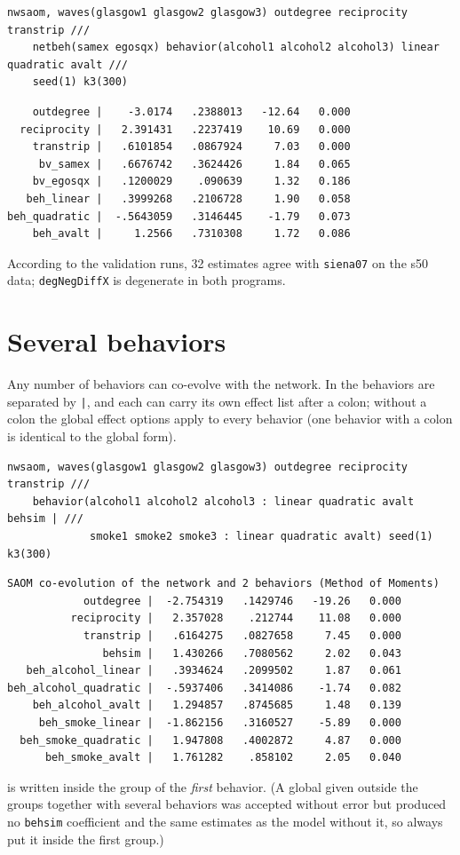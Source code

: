 \begin{lstlisting}
nwsaom, waves(glasgow1 glasgow2 glasgow3) outdegree reciprocity transtrip ///
    netbeh(samex egosqx) behavior(alcohol1 alcohol2 alcohol3) linear quadratic avalt ///
    seed(1) k3(300)
\end{lstlisting}
\begin{lstlisting}
    outdegree |    -3.0174   .2388013   -12.64   0.000
  reciprocity |   2.391431   .2237419    10.69   0.000
    transtrip |   .6101854   .0867924     7.03   0.000
     bv_samex |   .6676742   .3624426     1.84   0.065
    bv_egosqx |   .1200029    .090639     1.32   0.186
   beh_linear |   .3999268   .2106728     1.90   0.058
beh_quadratic |  -.5643059   .3146445    -1.79   0.073
    beh_avalt |     1.2566   .7310308     1.72   0.086
\end{lstlisting}

According to the validation runs, 32  estimates agree with \texttt{siena07} on the s50 data; \texttt{degNegDiffX} is degenerate in both programs.

\section{Several behaviors}\label{sec:multibeh}

Any number of behaviors can co-evolve with the network. In  the behaviors are separated by \texttt{|}, and each can carry its own effect list after a colon; without a colon the global effect options apply to every behavior (one behavior with a colon is identical to the global form).

\begin{lstlisting}
nwsaom, waves(glasgow1 glasgow2 glasgow3) outdegree reciprocity transtrip ///
    behavior(alcohol1 alcohol2 alcohol3 : linear quadratic avalt behsim | ///
             smoke1 smoke2 smoke3 : linear quadratic avalt) seed(1) k3(300)
\end{lstlisting}
\begin{lstlisting}
SAOM co-evolution of the network and 2 behaviors (Method of Moments)
            outdegree |  -2.754319   .1429746   -19.26   0.000
          reciprocity |   2.357028    .212744    11.08   0.000
            transtrip |   .6164275   .0827658     7.45   0.000
               behsim |   1.430266   .7080562     2.02   0.043
   beh_alcohol_linear |   .3934624   .2099502     1.87   0.061
beh_alcohol_quadratic |  -.5937406   .3414086    -1.74   0.082
    beh_alcohol_avalt |   1.294857   .8745685     1.48   0.139
     beh_smoke_linear |  -1.862156   .3160527    -5.89   0.000
  beh_smoke_quadratic |   1.947808   .4002872     4.87   0.000
      beh_smoke_avalt |   1.761282    .858102     2.05   0.040
\end{lstlisting}
 is written inside the group of the \emph{first} behavior. (A global  given outside the groups together with several behaviors was accepted without error but produced no \texttt{behsim} coefficient and the same estimates as the model without it, so always put it inside the first group.)

